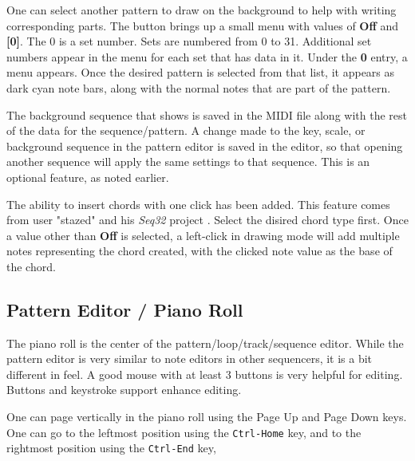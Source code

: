    One can select another pattern to draw on the background to help with
   writing corresponding parts.
   The button brings up a small menu with values of \textbf{Off} and
   \textbf{[0]}.  The 0 is a set number. Sets are numbered from 0 to 31.
   Additional set numbers appear in the menu for each set that has data in it.
   Under the \textbf{0}
   entry, a menu appears.
   Once the desired pattern is selected from that list, it appears as dark cyan
   note bars, along with the normal notes that are part of the pattern.

   The background sequence that shows is saved in the MIDI file
   along with the rest of the data for the sequence/pattern.
   A change made to the key, scale, or background sequence in
   the pattern editor is saved in the editor, so that opening another sequence
   will apply the same settings to that sequence.  This is an optional feature,
   as noted earlier.

   The ability to insert chords with one click has been added.
   This feature comes from user "stazed"
   and his \textsl{Seq32} project \cite{seq32}.
   Select the disired chord type first.
   Once a value other than \textbf{Off} is selected, a left-click
   in drawing mode will add multiple notes representing the chord
   created, with the clicked note value as the base of the chord.

\subsection{Pattern Editor / Piano Roll}
\label{subsec:pattern_editor_piano_roll}

   The piano roll is the center of the pattern/loop/track/sequence editor.
   While the pattern
   editor is very similar to note editors in other sequencers, it is a bit
   different in feel.  A good mouse with at least 3 buttons is very helpful
   for editing.  Buttons and keystroke support enhance editing.

   One can page vertically in the piano roll using the
    Page Up and 
    Page Down keys.
   One can go to the leftmost position using the 
    \texttt{Ctrl-Home} key,
   and to the rightmost position using the
    \texttt{Ctrl-End} key,

